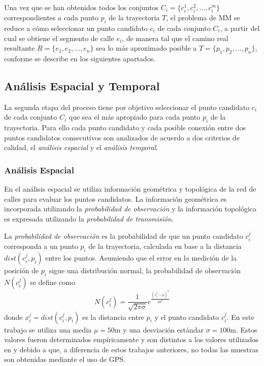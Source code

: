 Una vez que se han obtenidos todos los conjuntos $C_i = \{c_{i}^{1}, c_{i}^{2}, \dots, c_{i}^{m}\}$ correspondientes a cada punto $p_i$ de la trayectoria $T$, el problema de MM se reduce a cómo seleccionar un punto candidato $c_i$ de cada conjunto $C_i$, a partir del cual se obtiene el segmento de calle $e_i$, de manera tal que el camino real resultante $R = \{ e_1, e_2, \dots, e_n \}$ sea lo más aproximado posible a $T = \{ p_1, p_2, \dots, p_n\}$, conforme se describe en los siguientes apartados.

\subsection{Análisis Espacial y Temporal}

La segunda etapa del proceso tiene por objetivo seleccionar el punto candidato $c_i$ de cada conjunto $C_i$ que sea el más apropiado para cada punto $p_i$ de la trayectoria. Para ello cada punto candidato y cada posible conexión entre dos puntos candidatos consecutivos son analizados de acuerdo a dos criterios de calidad, el \emph{análisis espacial} y el \emph{análisis temporal}.

\subsubsection{Análisis Espacial}

En el análisis espacial se utiliza información geométrica y topológica de la red de calles para evaluar los puntos candidatos. La información geométrica es incorporada utilizando la \emph{probabilidad de observación} y la información topológica es expresada utilizando la \emph{probabilidad de transmisión}.

La \emph{probabilidad de observación} es la probabilidad de que un punto candidato $c_{i}^{j}$ corresponda a un punto $p_i$ de la trayectoria, calculada en base a la distancia $dist(c_{i}^{j},p_i)$ entre los puntos. Asumiendo que el error en la medición de la posición de $p_i$ sigue una distribución normal, la probabilidad de observación $N(c_{i}^{j})$ se define como
\begin{equation} \label{probabilidad_de_observacion}
N(c_{i}^{j}) = \frac {1}{\sqrt { 2 \pi \sigma }} {e}^{\frac {{(x_{i}^{j} - \mu)}^{2}}{{ 2 \sigma}^{2}}}
\end{equation}
donde $x_{i}^{j} = dist(c_{i}^{j},p_i)$ es la distancia entre $p_i$ y el punto candidato $c_{i}^{j}$. En este trabajo se utiliza una media $\mu = 50\text{m}$ y una desviación estándar $\sigma = 100\text{m}$. Estos valores fueron determinados empíricamente y son distintos a los valores utilizados en \cite{lou2009map} y \cite{budigm2012algorithm} debido a que, a diferencia de estos trabajos anteriores, no todas las muestras son obtenidas mediante el uso de GPS.


